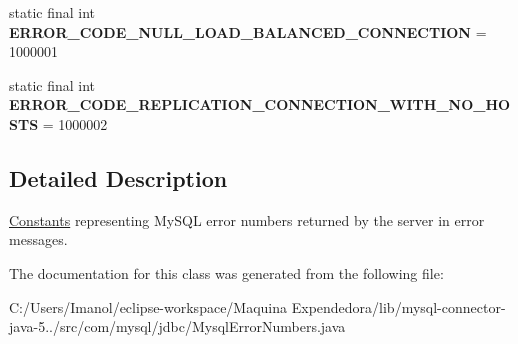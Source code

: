 \begin{DoxyCompactItemize}
\mbox{\label{classcom_1_1mysql_1_1jdbc_1_1_mysql_error_numbers_ad8d789b43b1cabad218980945ad78156}} 
static final int {\bfseries E\+R\+R\+O\+R\+\_\+\+C\+O\+D\+E\+\_\+\+N\+U\+L\+L\+\_\+\+L\+O\+A\+D\+\_\+\+B\+A\+L\+A\+N\+C\+E\+D\+\_\+\+C\+O\+N\+N\+E\+C\+T\+I\+ON} = 1000001
\item 
\mbox{\label{classcom_1_1mysql_1_1jdbc_1_1_mysql_error_numbers_ac536740324112b1ae50f129ff7ee1eff}} 
static final int {\bfseries E\+R\+R\+O\+R\+\_\+\+C\+O\+D\+E\+\_\+\+R\+E\+P\+L\+I\+C\+A\+T\+I\+O\+N\+\_\+\+C\+O\+N\+N\+E\+C\+T\+I\+O\+N\+\_\+\+W\+I\+T\+H\+\_\+\+N\+O\+\_\+\+H\+O\+S\+TS} = 1000002
\end{DoxyCompactItemize}


\subsection{Detailed Description}
\mbox{\hyperlink{classcom_1_1mysql_1_1jdbc_1_1_constants}{Constants}} representing My\+S\+QL error numbers returned by the server in error messages. 

The documentation for this class was generated from the following file\+:\begin{DoxyCompactItemize}
\item 
C\+:/\+Users/\+Imanol/eclipse-\/workspace/\+Maquina Expendedora/lib/mysql-\/connector-\/java-\/5../src/com/mysql/jdbc/Mysql\+Error\+Numbers.\+java\end{DoxyCompactItemize}

